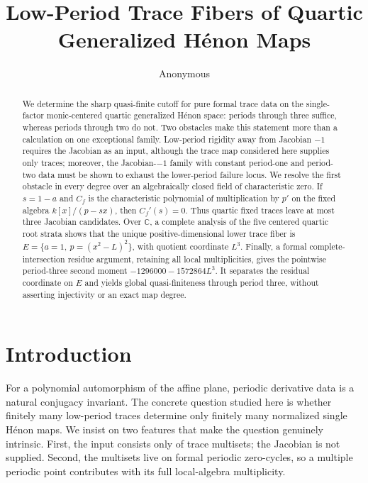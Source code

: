\documentclass[11pt]{article}
\title{Low-Period Trace Fibers of Quartic Generalized H\'enon Maps}
\author{Anonymous}
\date{}
\theoremstyle{definition}
\newcommand{\C}{\mathbb C}
\begin{document}
\maketitle

\begin{abstract}
We determine the sharp quasi-finite cutoff for pure formal trace data on the single-factor monic-centered quartic generalized H\'enon space: periods through three suffice, whereas periods through two do not. Two obstacles make this statement more than a calculation on one exceptional family. Low-period rigidity away from Jacobian $-1$ requires the Jacobian as an input, although the trace map considered here supplies only traces; moreover, the Jacobian-$-1$ family with constant period-one and period-two data must be shown to exhaust the lower-period failure locus. We resolve the first obstacle in every degree over an algebraically closed field of characteristic zero. If $s=1-a$ and $C_f$ is the characteristic polynomial of multiplication by $p'$ on the fixed algebra $k[x]/(p-sx)$, then $C_f'(s)=0$. Thus quartic fixed traces leave at most three Jacobian candidates. Over $\C$, a complete analysis of the five centered quartic root strata shows that the unique positive-dimensional lower trace fiber is
$E=\{a=1,\ p=(x^2-L)^2\}$, with quotient coordinate $L^3$. Finally, a formal complete-intersection residue argument, retaining all local multiplicities, gives the pointwise period-three second moment
$-1296000-1572864L^3$. It separates the residual coordinate on $E$ and yields global quasi-finiteness through period three, without asserting injectivity or an exact map degree.
\end{abstract}

\section{Introduction}
\label{sec:introduction}

For a polynomial automorphism of the affine plane, periodic derivative data is a natural conjugacy invariant. The concrete question studied here is whether finitely many low-period traces determine only finitely many normalized single H\'enon maps. We insist on two features that make the question genuinely intrinsic. First, the input consists only of trace multisets; the Jacobian is not supplied. Second, the multisets live on formal periodic zero-cycles, so a multiple periodic point contributes with its full local-algebra multiplicity.
\end{document}
